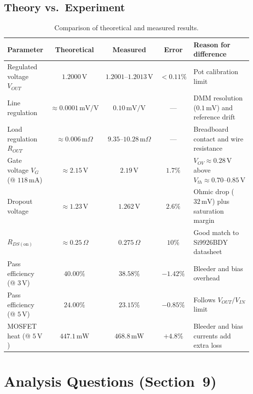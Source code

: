 \documentclass[11pt,a4paper]{article}
\begin{document}
\subsection{Theory vs.\ Experiment}
\begin{table}[htbp]
\centering
\caption{Comparison of theoretical and measured results.}
\label{tab:comparison}
\small
\begin{tabularx}{\textwidth}{l c c c X}
\toprule
\textbf{Parameter} & \textbf{Theoretical} & \textbf{Measured} & \textbf{Error} & \textbf{Reason for difference} \\
\midrule
Regulated voltage $V_{OUT}$ & $1.2000\,\text{V}$ & $1.2001\text{--}1.2013\,\text{V}$ & $<0.11\%$ & Pot calibration limit \\
Line regulation & $\approx 0.0001\,\text{mV/V}$ & $0.10\,\text{mV/V}$ & --- & DMM resolution ($0.1\,\text{mV}$) and reference drift \\
Load regulation $R_{OUT}$ & $\approx 0.006\,\text{m}\Omega$ & $9.35\text{--}10.28\,\text{m}\Omega$ & --- & Breadboard contact and wire resistance \\
Gate voltage $V_G$ (@ $118\,\text{mA}$) & $\approx 2.15\,\text{V}$ & $2.19\,\text{V}$ & $1.7\%$ & $V_{OV} \approx 0.28\,\text{V}$ above $V_{th} \approx 0.70\text{--}0.85\,\text{V}$ \\
Dropout voltage & $\approx 1.23\,\text{V}$ & $1.262\,\text{V}$ & $2.6\%$ & Ohmic drop ($32\,\text{mV}$) plus saturation margin \\
$R_{DS(\text{on})}$ & $\approx 0.25\,\Omega$ & $0.275\,\Omega$ & $10\%$ & Good match to Si9926BDY datasheet \\
Pass efficiency (@ $3\,\text{V}$) & $40.00\%$ & $38.58\%$ & $-1.42\%$ & Bleeder and bias overhead \\
Pass efficiency (@ $5\,\text{V}$) & $24.00\%$ & $23.15\%$ & $-0.85\%$ & Follows $V_{OUT}/V_{IN}$ limit \\
MOSFET heat (@ $5\,\text{V}$) & $447.1\,\text{mW}$ & $468.8\,\text{mW}$ & $+4.8\%$ & Bleeder and bias currents add extra loss \\
\bottomrule
\end{tabularx}
\end{table}

\section{Analysis Questions (Section~9)}
\end{document}
